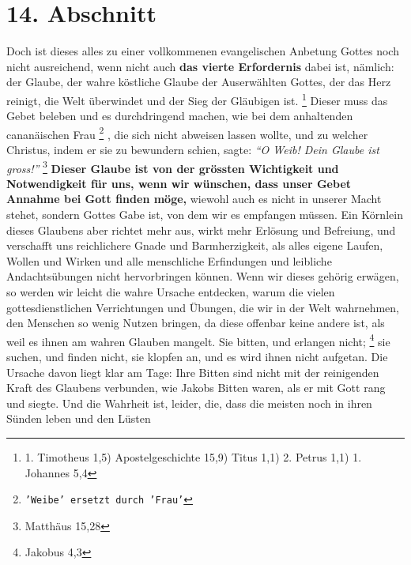 \section{14. Abschnitt} \label{kap6_ab14}

Doch ist dieses alles zu einer vollkommenen evangelischen Anbetung Gottes noch
nicht ausreichend, wenn nicht auch \textbf{das vierte Erfordernis} dabei ist,
nämlich:
der Glaube, der wahre köstliche Glaube der Auserwählten Gottes, der das Herz
reinigt, die Welt überwindet und der Sieg der Gläubigen ist.
\footnote{1. Timotheus 1,5) Apostelgeschichte 15,9) Titus 1,1) 2. Petrus 1,1) 1.
Johannes 5,4}
Dieser muss das
Gebet beleben und es durchdringend machen, wie bei dem anhaltenden cananäischen
Frau \footnote{\texttt{'Weibe' ersetzt durch 'Frau'}}
  , die sich
nicht abweisen lassen wollte, und zu welcher Christus, indem er
sie zu bewundern schien, sagte:
\textit{"`O Weib! Dein Glaube ist gross!"'}
\footnote{Matthäus 15,28}
\textbf{Dieser Glaube ist von der grössten
Wichtigkeit
und Notwendigkeit für uns, wenn wir wünschen, dass unser Gebet Annahme bei Gott
finden möge,} wiewohl auch es nicht in unserer Macht stehet, sondern Gottes Gabe
ist, von dem wir es empfangen müssen. Ein Körnlein dieses Glaubens aber richtet
mehr aus, wirkt mehr Erlösung und Befreiung, und verschafft uns
reichlichere
Gnade und Barmherzigkeit, als alles eigene Laufen, Wollen und Wirken und alle
menschliche Erfindungen und leibliche Andachtsübungen nicht hervorbringen
können. Wenn wir dieses gehörig erwägen, so werden wir leicht die wahre Ursache
entdecken, warum die vielen gottesdienstlichen Verrichtungen und Übungen, die
wir in der Welt wahrnehmen, den Menschen so wenig Nutzen bringen, da diese
offenbar keine andere ist, als weil es ihnen am wahren Glauben mangelt. Sie
bitten, und erlangen nicht;
\footnote{Jakobus 4,3}
sie suchen, und finden nicht, sie
klopfen an, und es wird ihnen nicht aufgetan. Die Ursache davon liegt klar am
Tage: Ihre Bitten sind nicht mit der reinigenden Kraft des Glaubens verbunden,
wie Jakobs  Bitten waren, als er mit Gott rang und
siegte. Und die Wahrheit
ist, leider, die, dass die meisten noch in ihren Sünden leben und den Lüsten
